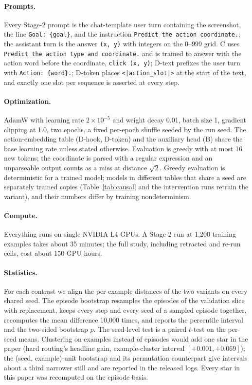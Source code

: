\documentclass{article}
\begin{document}
\paragraph{Prompts.} Every Stage-2 prompt is the chat-template user turn containing the screenshot, the line \texttt{Goal: \{goal\}}, and the instruction \texttt{Predict the action coordinate.}; the assistant turn is the answer \texttt{(x, y)} with integers on the $0$--$999$ grid. C uses \texttt{Predict the action type and coordinate.} and is trained to answer with the action word before the coordinate, \texttt{click (x, y)}; D-text prefixes the user turn with \texttt{Action: \{word\}.}; D-token places \texttt{<|action\_slot|>} at the start of the text, and exactly one slot per sequence is asserted at every step.

\paragraph{Optimization.} AdamW with learning rate $2\times10^{-5}$ and weight decay 0.01, batch size 1, gradient clipping at 1.0, two epochs, a fixed per-epoch shuffle seeded by the run seed. The action-embedding table (D-hook, D-token) and the auxiliary head (B) share the base learning rate unless stated otherwise. Evaluation is greedy with at most 16 new tokens; the coordinate is parsed with a regular expression and an unparseable output counts as a miss at distance $\sqrt{2}$. Greedy evaluation is deterministic for a trained model; models in different tables that share a seed are separately trained copies (Table~\ref{tab:causal} and the intervention runs retrain the variant), and their numbers differ by training nondeterminism.

\paragraph{Compute.} Everything runs on single NVIDIA L4 GPUs. A Stage-2 run at 1,200 training examples takes about 35 minutes; the full study, including retracted and re-run cells, cost about 150 GPU-hours.

\paragraph{Statistics.} For each contrast we align the per-example distances of the two variants on every shared seed. The episode bootstrap resamples the episodes of the validation slice with replacement, keeps every step and every seed of a sampled episode together, recomputes the mean difference 10,000 times, and reports the percentile interval and the two-sided bootstrap $p$. The seed-level test is a paired $t$-test on the per-seed means. Clustering on examples instead of episodes would add one star in the paper (hard routing's headline gain, example-cluster interval $[+0.001, +0.069]$); the (seed, example)-unit bootstrap and its permutation counterpart give intervals about a third narrower still and are reported in the released logs. Every star in this paper was recomputed on the episode basis.
\end{document}
